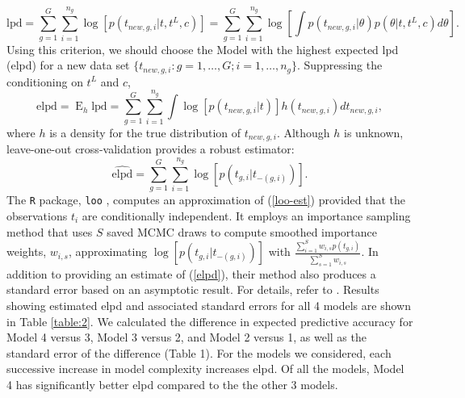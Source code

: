 \documentclass[12pt]{article}
\newcommand{\op}{\operatorname}
\begin{document}
\begin{equation}
\mbox{lpd} = \sum_{g=1}^G \sum_{i=1}^{n_g} \log[p(t_{new,g,i}|t, t^L, c)] = \sum_{g=1}^G \sum_{i=1}^{n_g} \log \left[ \int p(t_{new,g, i}|\theta) p(\theta|t,t^L,c) d\theta \right].
\end{equation}
\noindent Using this criterion, we should choose the Model with the highest expected lpd (elpd) for a new data set $\{t_{new,g,i}:g=1,\ldots,G; i=1,\ldots,n_g\}$. Suppressing the conditioning on $t^L$ and $c$,
\begin{equation}
\mbox{elpd} = \op{E}_h \mbox{lpd} = \sum_{g=1}^G \sum_{i=1}^{n_g} \int \log [p(t_{new, g, i}|t)] h(t_{new,g,i}) d t_{new,g,i},
\label{elpd}
\end{equation}
where $h$ is a density for the true distribution of $t_{new,g,i}$. Although $h$ is unknown, leave-one-out cross-validation provides a robust estimator:
\begin{equation}
\widehat{\text{elpd}} = \sum_{g=1}^G \sum_{i=1}^{n_g} \log [p(t_{g,i}|t_{-(g,i)})].
\label{loo-est}
\end{equation}
The \texttt{R} package, \texttt{loo} \citep{loo}, computes an approximation of (\ref{loo-est}) provided that the observations $t_i$ are conditionally independent. It employs an importance sampling method that uses $S$ saved MCMC draws to compute smoothed importance weights, $w_{i,s}$, approximating $\log [p(t_{g,i}|t_{-(g,i)})]$ with $\frac{\sum_{i=1}^S w_{i,s} p(t_{g,i})}{\sum_{s=1}^S w_{i,s}}$. In addition to providing an estimate of (\ref{elpd}), their method also produces a standard error based on an asymptotic result. For details, refer to \cite{vehtari}.
Results showing estimated elpd and associated standard errors for all 4 models are shown in Table \ref{table:2}.
 We calculated the difference in expected predictive accuracy for Model 4 versus 3, Model 3 versus 2, and Model 2 versus 1, as well as the standard error of the difference (Table 1). For the models we considered, each successive increase in model complexity increases elpd.  Of all the models, Model 4 has significantly better elpd compared to the the other 3 models.
\end{document}
